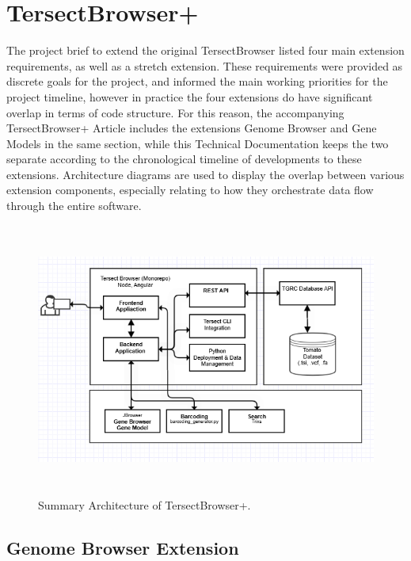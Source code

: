 \documentclass[12pt]{article}
\begin{document}
\section{TersectBrowser+}
The project brief to extend the original TersectBrowser listed four main extension requirements, as well as a stretch extension. These requirements were provided as discrete goals for the project, and informed the main working priorities for the project timeline, however in practice the four extensions do have significant overlap in terms of code structure. For this reason, the accompanying TersectBrowser+ Article includes the extensions Genome Browser and Gene Models in the same section, while this Technical Documentation keeps the two separate according to the chronological timeline of developments to these extensions. Architecture diagrams are used to display the overlap between various extension components, especially relating to how they orchestrate data flow through the entire software.
\\
\begin{figure}[h]
    \centering
    \includegraphics[width=15cm, height=9cm]{high_level_arch_draft.png}
    \caption{Summary Architecture of TersectBrowser+.}
\end{figure}

\subsection{Genome Browser Extension}
\label{sec:Browser}
\end{document}
